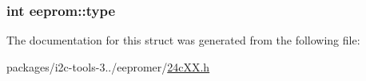 \subsubsection[{type}]{\setlength{\rightskip}{0pt plus 5cm}int eeprom\+::type}\label{structeeprom_a5f7af6dd1fae82c8077974e8cca136e3}


The documentation for this struct was generated from the following file\+:\begin{DoxyCompactItemize}
\item 
packages/i2c-\/tools-\/3../eepromer/\hyperlink{24cXX_8h}{24c\+X\+X.\+h}\end{DoxyCompactItemize}

